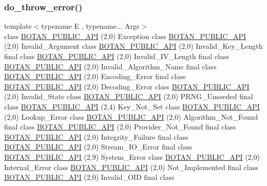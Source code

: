 \subsubsection{\texorpdfstring{do\+\_\+throw\+\_\+error()}{do\_throw\_error()}}
{\footnotesize\ttfamily template$<$typename E , typename... Args$>$ \\
class \hyperlink{namespace_botan_a6b9388030d872e586a4655b776ac9501}{B\+O\+T\+A\+N\+\_\+\+P\+U\+B\+L\+I\+C\+\_\+\+A\+PI} (2,0) Exception class \hyperlink{namespace_botan_a6b9388030d872e586a4655b776ac9501}{B\+O\+T\+A\+N\+\_\+\+P\+U\+B\+L\+I\+C\+\_\+\+A\+PI} (2,0) Invalid\+\_\+\+Argument class \hyperlink{namespace_botan_a6b9388030d872e586a4655b776ac9501}{B\+O\+T\+A\+N\+\_\+\+P\+U\+B\+L\+I\+C\+\_\+\+A\+PI} (2,0) Invalid\+\_\+\+Key\+\_\+\+Length final class \hyperlink{namespace_botan_a6b9388030d872e586a4655b776ac9501}{B\+O\+T\+A\+N\+\_\+\+P\+U\+B\+L\+I\+C\+\_\+\+A\+PI} (2,0) Invalid\+\_\+\+I\+V\+\_\+\+Length final class \hyperlink{namespace_botan_a6b9388030d872e586a4655b776ac9501}{B\+O\+T\+A\+N\+\_\+\+P\+U\+B\+L\+I\+C\+\_\+\+A\+PI} (2,0) Invalid\+\_\+\+Algorithm\+\_\+\+Name final class \hyperlink{namespace_botan_a6b9388030d872e586a4655b776ac9501}{B\+O\+T\+A\+N\+\_\+\+P\+U\+B\+L\+I\+C\+\_\+\+A\+PI} (2,0) Encoding\+\_\+\+Error final class \hyperlink{namespace_botan_a6b9388030d872e586a4655b776ac9501}{B\+O\+T\+A\+N\+\_\+\+P\+U\+B\+L\+I\+C\+\_\+\+A\+PI} (2,0) Decoding\+\_\+\+Error class \hyperlink{namespace_botan_a6b9388030d872e586a4655b776ac9501}{B\+O\+T\+A\+N\+\_\+\+P\+U\+B\+L\+I\+C\+\_\+\+A\+PI} (2,0) Invalid\+\_\+\+State class \hyperlink{namespace_botan_a6b9388030d872e586a4655b776ac9501}{B\+O\+T\+A\+N\+\_\+\+P\+U\+B\+L\+I\+C\+\_\+\+A\+PI} (2,0) P\+R\+N\+G\+\_\+\+Unseeded final class \hyperlink{namespace_botan_a6b9388030d872e586a4655b776ac9501}{B\+O\+T\+A\+N\+\_\+\+P\+U\+B\+L\+I\+C\+\_\+\+A\+PI} (2,4) Key\+\_\+\+Not\+\_\+\+Set class \hyperlink{namespace_botan_a6b9388030d872e586a4655b776ac9501}{B\+O\+T\+A\+N\+\_\+\+P\+U\+B\+L\+I\+C\+\_\+\+A\+PI} (2,0) Lookup\+\_\+\+Error class \hyperlink{namespace_botan_a6b9388030d872e586a4655b776ac9501}{B\+O\+T\+A\+N\+\_\+\+P\+U\+B\+L\+I\+C\+\_\+\+A\+PI} (2,0) Algorithm\+\_\+\+Not\+\_\+\+Found final class \hyperlink{namespace_botan_a6b9388030d872e586a4655b776ac9501}{B\+O\+T\+A\+N\+\_\+\+P\+U\+B\+L\+I\+C\+\_\+\+A\+PI} (2,0) Provider\+\_\+\+Not\+\_\+\+Found final class \hyperlink{namespace_botan_a6b9388030d872e586a4655b776ac9501}{B\+O\+T\+A\+N\+\_\+\+P\+U\+B\+L\+I\+C\+\_\+\+A\+PI} (2,0) Integrity\+\_\+\+Failure final class \hyperlink{namespace_botan_a6b9388030d872e586a4655b776ac9501}{B\+O\+T\+A\+N\+\_\+\+P\+U\+B\+L\+I\+C\+\_\+\+A\+PI} (2,0) Stream\+\_\+\+I\+O\+\_\+\+Error final class \hyperlink{namespace_botan_a6b9388030d872e586a4655b776ac9501}{B\+O\+T\+A\+N\+\_\+\+P\+U\+B\+L\+I\+C\+\_\+\+A\+PI} (2,9) System\+\_\+\+Error class \hyperlink{namespace_botan_a6b9388030d872e586a4655b776ac9501}{B\+O\+T\+A\+N\+\_\+\+P\+U\+B\+L\+I\+C\+\_\+\+A\+PI} (2,0) Internal\+\_\+\+Error class \hyperlink{namespace_botan_a6b9388030d872e586a4655b776ac9501}{B\+O\+T\+A\+N\+\_\+\+P\+U\+B\+L\+I\+C\+\_\+\+A\+PI} (2,0) Not\+\_\+\+Implemented final class \hyperlink{namespace_botan_a6b9388030d872e586a4655b776ac9501}{B\+O\+T\+A\+N\+\_\+\+P\+U\+B\+L\+I\+C\+\_\+\+A\+PI} (2,0) Invalid\+\_\+\+O\+ID final class }
